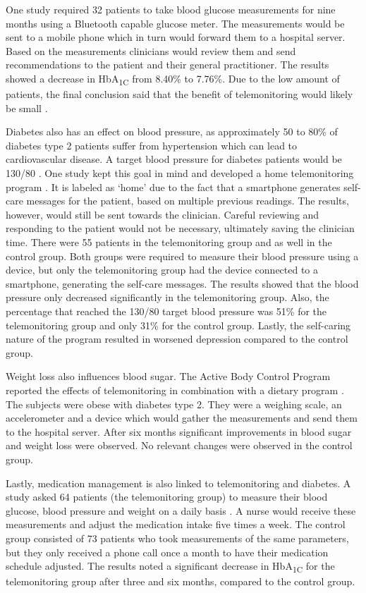         One study required 32 patients to take blood glucose measurements for nine months using a Bluetooth capable glucose meter. The measurements would be sent to a mobile phone which in turn would forward them to a hospital server. Based on the measurements clinicians would review them and send recommendations to the patient and their general practitioner. The results showed a decrease in HbA\textsubscript{1C} from 8.40\% to 7.76\%. Due to the low amount of patients, the final conclusion said that the benefit of telemonitoring would likely be small \cite{istepanian2009evaluation}.

        Diabetes also has an effect on blood pressure, as approximately 50 to 80\% of diabetes type 2 patients suffer from hypertension which can lead to cardiovascular disease. A target blood pressure for diabetes patients would be 130/80 \cite{landsberg2004diabetes}. One study kept this goal in mind and developed a home telemonitoring program \cite{logan2012effect}. It is labeled as `home' due to the fact that a smartphone generates self-care messages for the patient, based on multiple previous readings. The results, however, would still be sent towards the clinician. Careful reviewing and responding to the patient would not be necessary, ultimately saving the clinician time. There were 55 patients in the telemonitoring group and as well in the control group. Both groups were required to measure their blood pressure using a device, but only the telemonitoring group had the device connected to a smartphone, generating the self-care messages. The results showed that the blood pressure only decreased significantly in the telemonitoring group. Also, the percentage that reached the 130/80 target blood pressure was 51\% for the telemonitoring group and only 31\% for the control group. Lastly, the self-caring nature of the program resulted in worsened depression compared to the control group.

        Weight loss also influences blood sugar. The Active Body Control Program reported the effects of telemonitoring in combination with a dietary program \cite{luley2011weight}. The subjects were obese with diabetes type 2. They were a weighing scale, an accelerometer and a device which would gather the measurements and send them to the hospital server. After six months significant improvements in blood sugar and weight loss were observed. No relevant changes were observed in the control group.

        Lastly, medication management is also linked to telemonitoring and diabetes. A study asked 64 patients (the telemonitoring group) to measure their blood glucose, blood pressure and weight on a daily basis \cite{stone2009active}. A nurse would receive these measurements and adjust the medication intake five times a week. The control group consisted of 73 patients who took measurements of the same parameters, but they only received a phone call once a month to have their medication schedule adjusted. The results noted a significant decrease in HbA\textsubscript{1C} for the telemonitoring group after three and six months, compared to the control group.

